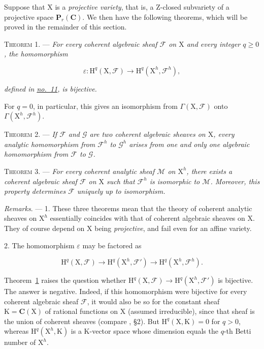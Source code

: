 Suppose that $\mathrm{X}$ is a \emph{projective variety}, that is, a Z-closed subvariety of a projective space $\mathbf{P}_r(\mathbf{C})$. We then have the following theorems, which will be proved in the remainder of this section.

\textsc{Theorem 1}. --- \emph{For every coherent algebraic sheaf $\mathcal{F}$ on $\mathrm{X}$ and every integer $q\geqslant0$, the homomorphism}

\begin{equation*}
\varepsilon:\mathrm{H}^q(\mathrm{X},\mathcal{F})
\longrightarrow
\mathrm{H}^q(\mathrm{X}^h,\mathcal{F}^h),
\end{equation*}

\emph{defined in \hyperref[gaga:no:11]{no.~11}, is bijective.}

For $q=0$, in particular, this gives an isomorphism from $\Gamma(\mathrm{X},\mathcal{F})$ onto $\Gamma(\mathrm{X}^h,\mathcal{F}^h)$.

\textsc{Theorem 2}. --- \emph{If $\mathcal{F}$ and $\mathcal{G}$ are two coherent algebraic sheaves on $\mathrm{X}$, every analytic homomorphism from $\mathcal{F}^h$ to $\mathcal{G}^h$ arises from one and only one algebraic homomorphism from $\mathcal{F}$ to $\mathcal{G}$.}

\textsc{Theorem 3}. --- \emph{For every coherent analytic sheaf $\mathcal{M}$ on $\mathrm{X}^h$, there exists a coherent algebraic sheaf $\mathcal{F}$ on $\mathrm{X}$ such that $\mathcal{F}^h$ is isomorphic to $\mathcal{M}$. Moreover, this property determines $\mathcal{F}$ uniquely up to isomorphism.}

\emph{Remarks}. --- 1. These three theorems mean that the theory of coherent analytic sheaves on $\mathrm{X}^h$ essentially coincides with that of coherent algebraic sheaves on $\mathrm{X}$. They of course depend on $\mathrm{X}$ being \emph{projective}, and fail even for an affine variety.

2. The homomorphism $\varepsilon$ may be factored as

\begin{equation*}
\mathrm{H}^q(\mathrm{X},\mathcal{F})
\longrightarrow
\mathrm{H}^q(\mathrm{X}^h,\mathcal{F}')
\longrightarrow
\mathrm{H}^q(\mathrm{X}^h,\mathcal{F}^h).
\end{equation*}

Theorem~\hyperref[gaga:thm:1]{1} raises the question whether $\mathrm{H}^q(\mathrm{X},\mathcal{F})\to\mathrm{H}^q(\mathrm{X}^h,\mathcal{F}')$ is bijective. The answer is negative. Indeed, if this homomorphism were bijective for every coherent algebraic sheaf $\mathcal{F}$, it would also be so for the constant sheaf $\mathrm{K}=\mathbf{C}(\mathrm{X})$ of rational functions on $\mathrm{X}$ (assumed irreducible), since that sheaf is the union of coherent sheaves (compare , \S 2). But $\mathrm{H}^q(\mathrm{X},\mathrm{K})=0$ for $q>0$, whereas $\mathrm{H}^q(\mathrm{X}^h,\mathrm{K})$ is a $\mathrm{K}$-vector space whose dimension equals the $q$-th Betti number of $\mathrm{X}^h$.
